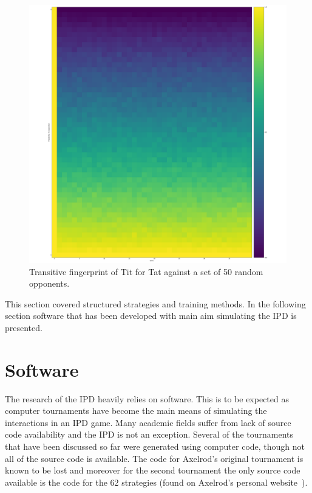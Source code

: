 \begin{figure}[!hbtp]
    \centering
    \includegraphics[height=.3\textheight]{src/chapters/02/Tit_for_Tat_fingerprint.png}
    \caption{Transitive fingerprint of Tit for Tat against a set of 50 random opponents.}
    \label{fig:transitive_fingerprinting}
\end{figure}

This section covered structured strategies and training methods. In the following
section software that has been developed with main aim simulating the IPD
is presented.

\section{Software}\label{section:software}

The research of the IPD heavily relies on software.
This is to be expected as computer tournaments have become the main
means of simulating the interactions in an IPD game.
Many academic fields suffer from lack of source code availability and the IPD
is not an exception. Several of the tournaments that have been discussed so far were generated
using computer code, though not all of the source code is available.
The code for Axelrod's original tournament is known to be lost and
moreover for the second tournament the only source code available is the code
for the 62 strategies (found on Axelrod's personal website~\cite{fortan_code}).

